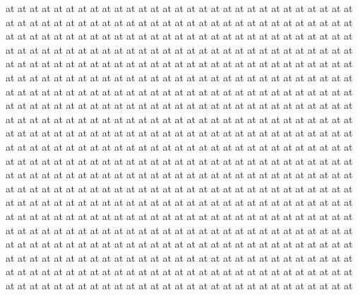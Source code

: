 at at at at at at at at at at at at at at at at at at at at at at at at at at at at at\\
at at at at at at at at at at at at at at at at at at at at at at at at at at at at at\\
at at at at at at at at at at at at at at at at at at at at at at at at at at at at at\\
at at at at at at at at at at at at at at at at at at at at at at at at at at at at at\\
at at at at at at at at at at at at at at at at at at at at at at at at at at at at at\\
at at at at at at at at at at at at at at at at at at at at at at at at at at at at at\\
at at at at at at at at at at at at at at at at at at at at at at at at at at at at at\\
at at at at at at at at at at at at at at at at at at at at at at at at at at at at at\\
at at at at at at at at at at at at at at at at at at at at at at at at at at at at at\\
at at at at at at at at at at at at at at at at at at at at at at at at at at at at at\\
at at at at at at at at at at at at at at at at at at at at at at at at at at at at at\\
at at at at at at at at at at at at at at at at at at at at at at at at at at at at at\\
at at at at at at at at at at at at at at at at at at at at at at at at at at at at at\\
at at at at at at at at at at at at at at at at at at at at at at at at at at at at at\\
at at at at at at at at at at at at at at at at at at at at at at at at at at at at at\\
at at at at at at at at at at at at at at at at at at at at at at at at at at at at at\\
at at at at at at at at at at at at at at at at at at at at at at at at at at at at at\\
at at at at at at at at at at at at at at at at at at at at at at at at at at at at at\\
at at at at at at at at at at at at at at at at at at at at at at at at at at at at at\\
at at at at at at at at at at at at at at at at at at at at at at at at at at at at at\\
at at at at at at at at at at at at at at at at at at at at at at at at at at at at at\\

